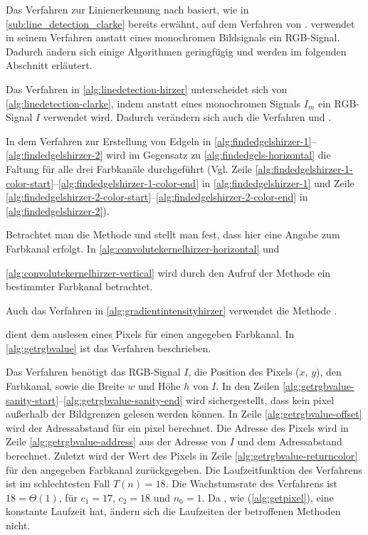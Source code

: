 Das Verfahren zur Linienerkennung nach \citeauthor{hirzer08} basiert, wie in \autoref{sub:line_detection_clarke} bereits
 erwähnt, auf dem Verfahren von \citeauthor{clarke96}. \citeauthor{hirzer08} verwendet in seinem Verfahren anstatt
 eines monochromen Bildsignals ein RGB-Signal. Dadurch ändern sich einige Algorithmen geringfügig und werden im
 folgenden Abschnitt erläutert.

Das Verfahren in \autoref{alg:linedetection-hirzer} unterscheidet sich von \autoref{alg:linedetection-clarke}, indem
 anstatt eines monochromen Signals $I_m$ ein RGB-Signal $I$ verwendet wird. Dadurch verändern sich auch die Verfahren
  und .

In dem Verfahren zur Erstellung von Edgeln in \autoref{alg:findedgelshirzer-1}--\autoref{alg:findedgelshirzer-2}
wird im Gegensatz zu \autoref{alg:findedgels-horizontal} die Faltung für alle drei Farbkanäle durchgeführt (Vgl. Zeile
 \ref{alg:findedgelshirzer-1-color-start}--\ref{alg:findedgelshirzer-1-color-end} in \autoref{alg:findedgelshirzer-1}
 und Zeile \ref{alg:findedgelshirzer-2-color-start}--\ref{alg:findedgelshirzer-2-color-end} in
 \autoref{alg:findedgelshirzer-2}).


Betrachtet man die Methode  und  stellt man fest, dass hier eine
 Angabe zum Farbkanal erfolgt. In \autoref{alg:convolutekernelhirzer-horizontal} und

 \autoref{alg:convolutekernelhirzer-vertical} wird durch den Aufruf der Methode  ein bestimmter
 Farbkanal betrachtet.

Auch das Verfahren  in \autoref{alg:gradientintensityhirzer} verwendet die Methode
 .


 dient dem auslesen eines Pixels für einen angegeben Farbkanal. In \autoref{alg:getrgbvalue} ist das Verfahren beschrieben.

Das Verfahren benötigt das RGB-Signal $I$, die Position des Pixels ($x$, $y$), den Farbkanal, sowie die Breite $w$
 und Höhe $h$ von $I$. In den Zeilen \ref{alg:getrgbvalue-sanity-start}--\ref{alg:getrgbvalue-sanity-end} wird
 sichergestellt, dass kein \gls{pixel} außerhalb der Bildgrenzen gelesen werden können. In Zeile
 \ref{alg:getrgbvalue-offset} wird der Adressabstand für ein \gls{pixel} berechnet. Die Adresse des Pixels wird in
 Zeile \ref{alg:getrgbvalue-address} aus der Adresse von $I$ und dem Adressabstand berechnet. Zuletzt wird der Wert des
 Pixels in Zeile \ref{alg:getrgbvalue-returncolor} für den angegeben Farbkanal zurückgegeben. Die Laufzeitfunktion
 des Verfahrens ist im schlechtesten Fall $T(n) = 18$. Die Wachstumsrate des Verfahrens ist $18 = \Theta(1)$, für
 $c_{1} = 17$, $c_{2} = 18$ und $n_{0} = 1$. Da , wie 
 (\autoref{alg:getpixel}), eine konstante Laufzeit hat, ändern sich die Laufzeiten der betroffenen Methoden nicht.


